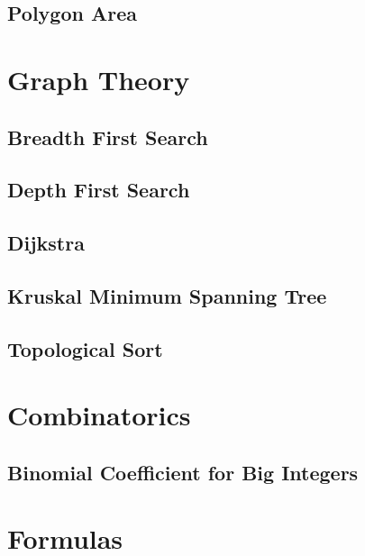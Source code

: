 \documentclass[11pt]{article}
\begin{document}
\subsection{Polygon Area}



\section{Graph Theory}

\subsection{Breadth First Search}


\subsection{Depth First Search}


\subsection{Dijkstra}


\subsection{Kruskal Minimum Spanning Tree}


\subsection{Topological Sort}



\section{Combinatorics}
\subsection{Binomial Coefficient for Big Integers}



\section{Formulas}
\end{document}
